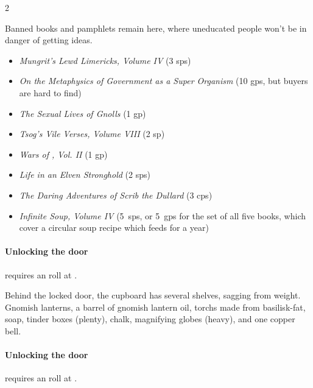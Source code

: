 \begin{multicols}{2}


\showStdSpells



Banned books and pamphlets remain here, where uneducated people won't be in danger of getting ideas.

\begin{itemize}
  \item
  \textit{Mungrit's Lewd Limericks, Volume IV} (3 \glspl{sp})
  \item
  \textit{On the Metaphysics of Government as a Super Organism} (10 \glspl{gp}, but buyers are hard to find)
  \item
  \textit{The Sexual Lives of Gnolls} (1 \gls{gp})
  \item
  \textit{Tsog's Vile Verses, Volume VIII} (2 sp)
  \item
  \textit{Wars of , Vol. II} (1 \gls{gp})
  \item
  \textit{Life in an Elven Stronghold} (2 \glspl{sp})
  \item
  \textit{The Daring Adventures of Scrib the Dullard} (3 \glspl{cp})
  \item
  \textit{Infinite Soup, Volume IV} (5~\glspl{sp}, or 5~\glspl{gp} for the set of all five books, which cover a circular soup recipe which feeds  for a year)
\end{itemize}

\paragraph{Unlocking the door}
requires an  roll at \tn[13].


Behind the locked door, the cupboard has several shelves, sagging from weight.
Gnomish lanterns, a barrel of gnomish lantern oil, \glspl{torch} made from \gls{basilisk}-fat, soap, tinder boxes (plenty), chalk, magnifying globes (heavy), and one copper bell.

\paragraph{Unlocking the door}
requires an  roll at \tn[13].


\end{multicols}
